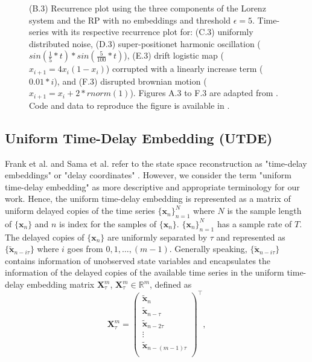 \documentclass[fleqn,10pt]{wlscirep}
\begin{document}
\begin{figure}[ht]
{	(B.3) Recurrence plot using the three components of the Lorenz system and the RP with no embeddings and threshold $\epsilon=5$.
	Time-series with its respective recurrence plot for:
	(C.3) uniformly distributed noise,
	(D.3) super-positionet harmonic oscillation ($sin( \frac{1}{5}*t) * sin( \frac{5}{100}*t) $),
	(E.3) drift logistic map ($x_{i+1} = 4 x_i (1- x_i) $) corrupted with a linearly increase term ($0.01*i$), and
	(F.3) disrupted brownian motion  ($x_{i+1} = x_i + 2*rnorm(1) $).
	Figures A.3 to F.3 are adapted from \cite{marwan2015}.
	Code and data to reproduce the figure is available in \cite{srep2021}.
    }
    \label{fig01}
\end{figure}

\subsection*{Uniform Time-Delay Embedding (UTDE)}\label{sec:utimedelayembedding}
Frank et al. and Sama et al. refer to the state space reconstruction
as "time-delay embeddings" or "delay coordinates" \cite{frank2010, sama2013}. 
However, we consider the term "uniform time-delay embedding"
as more descriptive and appropriate terminology for our work.
Hence, the uniform time-delay embedding is represented as a matrix of uniform delayed 
copies of the time series $\{ \boldsymbol{x}_n \}_{n=1}^N$ where $N$ is 
the sample length of $\{ \boldsymbol{x}_n \}$ and $n$ is index for the 
samples of $\{ \boldsymbol{x}_n \}$.
$\{ \boldsymbol{x}_n \}_{n=1}^N$ has a sample rate of $T$.
The delayed copies of $\{ \boldsymbol{x}_n \}$ are uniformly separated by $\tau$
and represented as $\{\boldsymbol{ \tilde{x} }_{n- i\tau} \}$
where $i$ goes from $0,1, \dots, (m-1)$.
Generally speaking, $\{\boldsymbol{ \tilde{x} }_{n- i\tau} \}$ contains
information of unobserved state variables and encapsulates the information of
the delayed copies of the available time series in the uniform time-delay 
embedding matrix $\boldsymbol{X}^{m}_{\tau}$, 
$\boldsymbol{X}^{m}_{\tau} \in \mathbb{R}^m$, defined as
\begin{equation}\label{eq:tde}
\boldsymbol{X}^{m}_{\tau}  =
\begin{pmatrix}
\boldsymbol{ \tilde{x} }_n \\
\boldsymbol{ \tilde{x} }_{n-\tau} \\
\boldsymbol{ \tilde{x} }_{n-2\tau} \\
\vdots \\
\boldsymbol{ \tilde{x} }_{n- (m-1) \tau} \\
\end{pmatrix}^\intercal, 
\end{equation}
\end{document}
